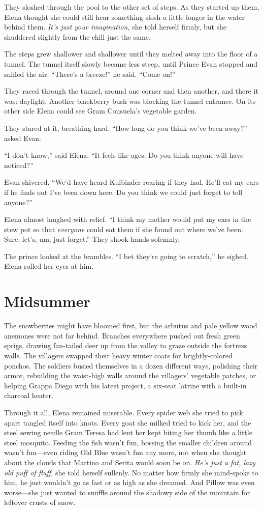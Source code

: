 \documentclass[10pt]{book}
\begin{document}
They sloshed through the pool to the other set of steps. As they started up them, Elena thought she could still hear something slosh a little longer in the water behind them. \emph{It's just your imagination,} she told herself firmly, but she shuddered slightly from the chill just the same.

The steps grew shallower and shallower until they melted away into the floor of a tunnel. The tunnel itself slowly became less steep, until Prince Evan stopped and sniffed the air. ``There's a breeze!'' he said. ``Come on!''

They raced through the tunnel, around one corner and then another, and there it was: daylight. Another blackberry bush was blocking the tunnel entrance.  On its other side Elena could see Gram Consuela's vegetable garden.

They stared at it, breathing hard. ``How long do you think we've been away?'' asked Evan.

``I don't know,'' said Elena. ``It feels like ages. Do you think anyone will have noticed?''

Evan shivered. ``We'd have heard Kulbinder roaring if they had. He'll eat my ears if he finds out I've been down here. Do you think we could just forget to tell anyone?''

Elena almost laughed with relief. ``I think my mother would put my ears in the stew pot so that \emph{everyone} could eat them if she found out where we've been. Sure, let's, um, just forget.'' They shook hands solemnly.

The prince looked at the brambles. ``I bet they're going to scratch,'' he sighed.  Elena rolled her eyes at him.

\chapter{Midsummer}

The snowberries might have bloomed first, but the arbutus and pale yellow wood anemones were not far behind. Branches everywhere pushed out fresh green sprigs, drawing fan-tailed deer up from the valley to graze outside the fortress walls. The villagers swapped their heavy winter coats for brightly-colored ponchos. The soldiers busied themselves in a dozen different ways, polishing their armor, rebuilding the waist-high walls around the villagers' vegetable patches, or helping Grappa Diego with his latest project, a six-seat latrine with a built-in charcoal heater.
 
Through it all, Elena remained miserable. Every spider web she tried to pick apart tangled itself into knots. Every goat she milked tried to kick her, and the steel sewing needle Gram Teresa had lent her kept biting her thumb like a little steel mosquito.  Feeding the fish wasn't fun, bossing the smaller children around wasn't fun---even riding Old Blue wasn't fun any more, not when she thought about the clouds that Martino and Serita would soon be on. \emph{He's just a fat, lazy old puff of fluff,} she told herself sullenly. No matter how firmly she mind-spoke to him, he just wouldn't go as fast or as high as she dreamed. And Pillow was even worse---she just wanted to snuffle around the shadowy side of the mountain for leftover crusts of snow.
\end{document}
